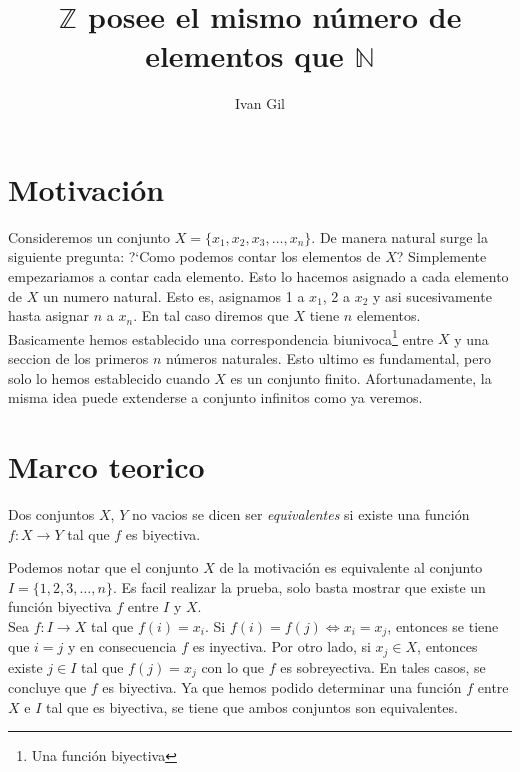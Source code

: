 \documentclass[letterpaper, 12pt]{article} %
\begin{document}
\title{$\mathbb{Z}$ posee el mismo número de elementos que $\mathbb{N}$}
\author{Ivan Gil}
\maketitle

\section{Motivación}

Consideremos un conjunto $X = \{x_{1}, x_{2}, x_{3}, \dots, x_{n}\}$. De manera
natural surge la siguiente pregunta: ?`Como podemos contar los elementos de $X$?
Simplemente empezariamos a contar cada elemento. Esto lo hacemos asignado a cada
elemento de $X$ un numero natural. Esto es, asignamos 1 a $x_{1}$, 2 a $x_{2}$ y
asi sucesivamente hasta asignar $n$ a $x_{n}$. En tal caso diremos que $X$ tiene
$n$ elementos.\\

Basicamente hemos establecido una correspondencia biunivoca\footnote{Una función
biyectiva} entre $X$ y una seccion de los primeros $n$ números naturales. Esto
ultimo es fundamental, pero solo lo hemos establecido cuando $X$ es un conjunto
finito. Afortunadamente, la misma idea puede extenderse a conjunto infinitos como
ya veremos.

\section{Marco teorico}

\begin{definition}[Equivalencia]
Dos conjuntos $X$, $Y$ no vacios se dicen ser {\it equivalentes} si existe una
función $f : X \longrightarrow Y$ tal que $f$ es biyectiva.
\end{definition}

\begin{observation}
Podemos notar que el conjunto $X$ de la motivación es equivalente al conjunto
$I = \{1,2,3, \dots, n\}$. Es facil realizar la prueba, solo basta mostrar
que existe un función biyectiva $f$ entre $I$ y $X$.\\

Sea $f : I \longrightarrow X$ tal que $f(i) = x_{i}$. Si $f(i) = f(j) \Leftrightarrow x_{i} = x_{j}$,
entonces se tiene que $i = j$ y en consecuencia $f$ es inyectiva. Por otro lado, si $x_{j} \in X$, entonces
existe $j \in I$ tal que $f(j) = x_{j}$ con lo que $f$ es sobreyectiva. En tales casos, se concluye que
$f$ es biyectiva. Ya que hemos podido determinar una función $f$ entre $X$ e $I$ tal que es biyectiva, se
tiene que ambos conjuntos son equivalentes.
\end{observation}
\end{document}
